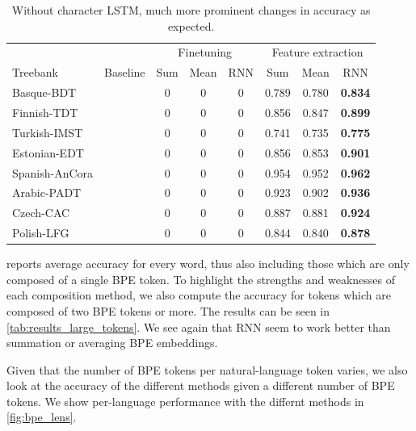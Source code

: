 \documentclass[11pt]{article}
\begin{document}
    

	\begin{table}[h]
	\centering
	\begin{tabular}{l|c|ccc|ccc}
		& & \multicolumn{3}{c}{Finetuning} & \multicolumn{3}{c}{Feature extraction} \\
		Treebank & Baseline & Sum & Mean & RNN & Sum & Mean & RNN \\
		\hline
		Basque-BDT      & & 0 & 0 & 0 & 0.789 & 0.780 & \textbf{0.834} \\
		Finnish-TDT     & & 0 & 0 & 0 & 0.856 & 0.847 & \textbf{0.899} \\
		Turkish-IMST    & & 0 & 0 & 0 & 0.741 & 0.735 & \textbf{0.775} \\
		Estonian-EDT    & & 0 & 0 & 0 & 0.856 & 0.853 & \textbf{0.901} \\
		Spanish-AnCora  & & 0 & 0 & 0 & 0.954 & 0.952 & \textbf{0.962} \\
		Arabic-PADT     & & 0 & 0 & 0 & 0.923 & 0.902 & \textbf{0.936} \\
		Czech-CAC       & & 0 & 0 & 0 & 0.887 & 0.881 & \textbf{0.924} \\
		Polish-LFG      & & 0 & 0 & 0 & 0.844 & 0.840 & \textbf{0.878} \\
		
	\end{tabular}
	\caption{\label{tab:results_tokens_nochars} Without character LSTM, much more prominent changes in accuracy as expected.}
\end{table}

 reports average accuracy for every word,
thus also including those which are only composed of a single BPE
token. To highlight the strengths and weaknesses of each composition method, we also compute the
accuracy for tokens which are composed of two BPE tokens or more. The
results can be seen in \cref{tab:results_large_tokens}.  We see again
that RNN seem to work better than summation or averaging BPE
embeddings.

Given that the number of BPE tokens per natural-language token varies, we also
look at the accuracy of the different methods given a different number of
BPE tokens. We show per-language performance with the differnt methods
in \cref{fig:bpe_lens}.
    
\end{document}
